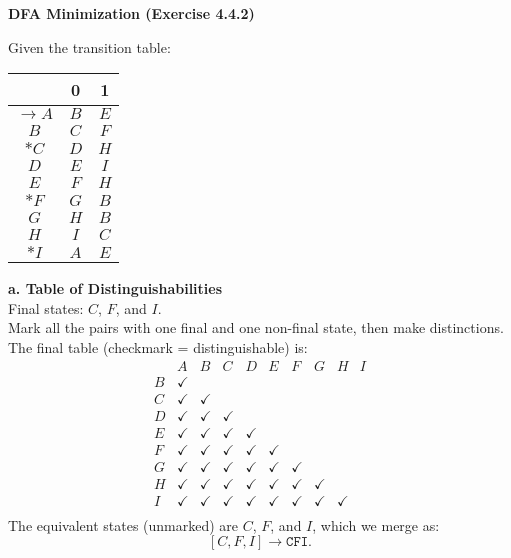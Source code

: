 \documentclass{article}
\theoremstyle{theorem}
\theoremstyle{definition}
\theoremstyle{remark}
\begin{document}
\bigskip

\textbf{DFA Minimization (Exercise 4.4.2)}

Given the transition table:
\begin{center}
\begin{tabular}{|c|c|c|}
\hline
       & 0   & 1   \\ \hline
$\rightarrow A$ & \(B\) & \(E\) \\ \hline
\(B\) & \(C\) & \(F\) \\ \hline
\(*C\) & \(D\) & \(H\) \\ \hline
\(D\) & \(E\) & \(I\) \\ \hline
\(E\) & \(F\) & \(H\) \\ \hline
\(*F\) & \(G\) & \(B\) \\ \hline
\(G\) & \(H\) & \(B\) \\ \hline
\(H\) & \(I\) & \(C\) \\ \hline
\(*I\) & \(A\) & \(E\) \\ \hline
\end{tabular}
\end{center}

\medskip

\textbf{a. Table of Distinguishabilities}\\[1mm]
Final states: \(C\), \(F\), and \(I\).\\[1mm]
Mark all the pairs with one final and one non-final state, then make distinctions. The final table (checkmark = distinguishable) is:
\[
\begin{array}{c|ccccccccc}
 & A & B & C & D & E & F & G & H & I \\ \hline
B & \checkmark &  &  &  &  &  &  &  &  \\
C & \checkmark & \checkmark &  &  &  &  &  &  &  \\
D & \checkmark & \checkmark & \checkmark &  &  &  &  &  &  \\
E & \checkmark & \checkmark & \checkmark & \checkmark &  &  &  &  &  \\
F & \checkmark & \checkmark & \checkmark & \checkmark & \checkmark &  &  &  &  \\
G & \checkmark & \checkmark & \checkmark & \checkmark & \checkmark & \checkmark &  &  &  \\
H & \checkmark & \checkmark & \checkmark & \checkmark & \checkmark & \checkmark & \checkmark &  &  \\
I & \checkmark & \checkmark & \checkmark & \checkmark & \checkmark & \checkmark & \checkmark & \checkmark &  \\
\end{array}
\]
The equivalent states (unmarked) are \(C\), \(F\), and \(I\), which we merge as:
\[
[C, F, I] \to \texttt{CFI}.
\]
\end{document}
